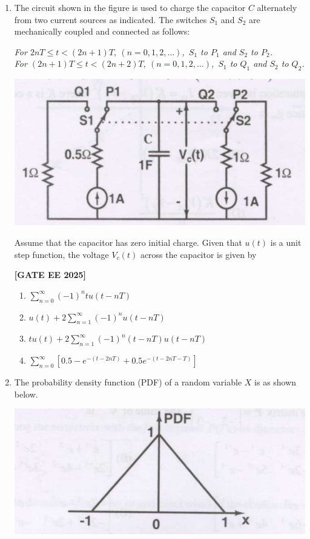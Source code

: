 \documentclass[12pt]{article}
\begin{document}
\begin{enumerate}[leftmargin=*, label=\textbf{Q.\arabic*:}]
\item The circuit shown in the figure is used to charge the capacitor $C$ alternately from two current sources as indicated. The switches $S_1$ and $S_2$ are mechanically coupled and connected as follows:

\textit{For $2nT \leq t < (2n+1)T,\ (n=0,1,2,\ldots)$,\ $S_1$ to $P_1$ and $S_2$ to $P_2$.}\\
\textit{For $(2n+1)T \leq t < (2n+2)T,\ (n=0,1,2,\ldots)$,\ $S_1$ to $Q_1$ and $S_2$ to $Q_2$.}
\begin{center}
\includegraphics[width=0.7\columnwidth]{figs/q23.png}
\end{center}
Assume that the capacitor has zero initial charge. Given that $u(t)$ is a unit step function, the voltage $V_c(t)$ across the capacitor is given by
 
\noindent \textbf{[GATE EE 2025]}
\begin{enumerate}
  \item $\displaystyle\sum_{n=0}^\infty (-1)^n t u(t-nT)$
  \item $\displaystyle u(t) + 2 \sum_{n=1}^\infty (-1)^n u(t-nT)$
  \item $\displaystyle t u(t) + 2 \sum_{n=1}^\infty (-1)^n (t-nT)u(t-nT)$
  \item $\displaystyle \sum_{n=0}^\infty \left[ 0.5 - e^{-(t-2nT)} + 0.5e^{-(t-2nT-T)} \right]$
\end{enumerate}

\newpage

\item
The probability density function (PDF) of a random variable $X$ is as shown below.

\begin{center}
\includegraphics[width=0.5\columnwidth]{figs/q24a.png}
\end{center}


\end{enumerate}
\end{document}
